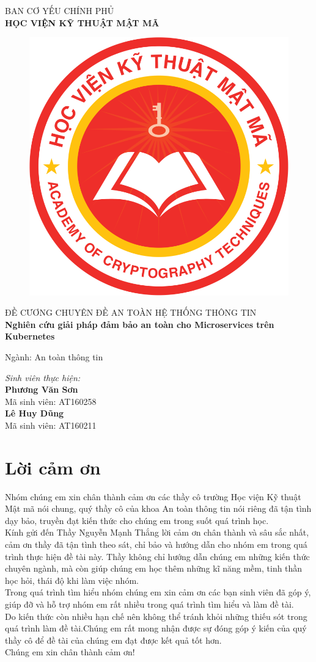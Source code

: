 \documentclass[12pt,a4paper]{report}
\author{LHD}
\author{LHD}
\begin{document}
	\begin{center}
		BAN CƠ YẾU CHÍNH PHỦ\\
		\textbf{HỌC VIỆN KỸ THUẬT MẬT MÃ}
	\end{center}
\begin{figure}[h]
	\centering
	\includegraphics[width=0.25\linewidth]{"Pics/Logo HV"}
	\label{fig:logo-hv}
\end{figure}

\begin{center}
	ĐỀ CƯƠNG CHUYÊN ĐỀ AN TOÀN HỆ THỐNG THÔNG TIN\\
	\textbf{Nghiên cứu giải pháp đảm bảo an toàn cho Microservices trên Kubernetes}
\end{center}
\begin{flushright}
	Ngành: An toàn thông tin
\end{flushright}
\bigskip
\bigskip
\begin{flushleft}
	\textit{Sinh viên thực hiện:}\\
	\textbf{Phương Văn Sơn}\\
	Mã sinh viên: AT160258\\
	\textbf{Lê Huy Dũng}\\
	Mã sinh viên: AT160211
\end{flushleft}

	\tableofcontents
	
	\chapter*{\centering Lời cảm ơn}
	Nhóm chúng em xin chân thành cảm ơn các thầy cô trường Học viện Kỹ thuật Mật mã nói chung, quý thầy cô của khoa An toàn thông tin nói riêng đã tận tình dạy bảo, truyền đạt kiến thức cho chúng em trong suốt quá trình học.\\
	Kính gửi đến Thầy Nguyễn Mạnh Thắng lời cảm ơn chân thành và sâu sắc nhất, cảm ơn thầy đã tận tình theo sát, chỉ bảo và hướng dẫn cho nhóm em trong quá trình thực hiện đề tài này. Thầy không chỉ hướng dẫn chúng em những kiến thức chuyên ngành, mà còn giúp chúng em học thêm những kĩ năng mềm, tinh thần học hỏi, thái độ khi làm việc nhóm.\\
	Trong quá trình tìm hiểu nhóm chúng em xin cảm ơn các bạn sinh viên đã góp ý, giúp đỡ và hỗ trợ nhóm em rất nhiều trong quá trình tìm hiểu và làm đề tài.\\
	Do kiến thức còn nhiều hạn chế nên không thể tránh khỏi những thiếu sót trong quá trình làm đề tài.Chúng em rất mong nhận được sự đóng góp ý kiến của quý thầy cô để đề tài của chúng em đạt được kết quả tốt hơn.\\
	Chúng em xin chân thành cảm ơn!
\end{document}
